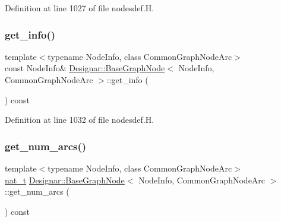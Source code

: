 Definition at line 1027 of file nodesdef.\+H.

\mbox{\label{class_designar_1_1_base_graph_node_a2f9f7069df485bc555066eb57d05e7a8}} 
\subsubsection{\texorpdfstring{get\+\_\+info()}{get\_info()}\hspace{0.1cm}{\footnotesize\ttfamily [2/2]}}
{\footnotesize\ttfamily template$<$typename Node\+Info, class Common\+Graph\+Node\+Arc$>$ \\
const Node\+Info\& \hyperlink{class_designar_1_1_base_graph_node}{Designar\+::\+Base\+Graph\+Node}$<$ Node\+Info, Common\+Graph\+Node\+Arc $>$\+::get\+\_\+info (\begin{DoxyParamCaption}{ }\end{DoxyParamCaption}) const\hspace{0.3cm}{\ttfamily [inline]}}



Definition at line 1032 of file nodesdef.\+H.

\mbox{\label{class_designar_1_1_base_graph_node_a3dbfd6cc251093522f54d51956968c54}} 
\subsubsection{\texorpdfstring{get\+\_\+num\+\_\+arcs()}{get\_num\_arcs()}}
{\footnotesize\ttfamily template$<$typename Node\+Info, class Common\+Graph\+Node\+Arc$>$ \\
\hyperlink{namespace_designar_aa72662848b9f4815e7bf31a7cf3e33d1}{nat\+\_\+t} \hyperlink{class_designar_1_1_base_graph_node}{Designar\+::\+Base\+Graph\+Node}$<$ Node\+Info, Common\+Graph\+Node\+Arc $>$\+::get\+\_\+num\+\_\+arcs (\begin{DoxyParamCaption}{ }\end{DoxyParamCaption}) const\hspace{0.3cm}{\ttfamily [inline]}}



